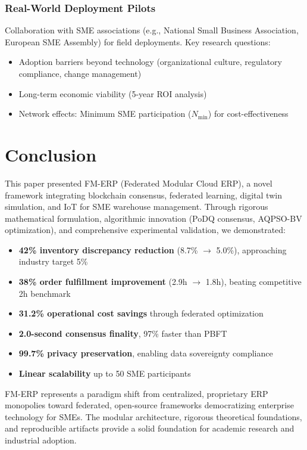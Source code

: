 \documentclass[times,10pt,twocolumn]{jucs2e}
\begin{document}
\subsubsection{Real-World Deployment Pilots}

Collaboration with SME associations (e.g., National Small Business Association, European SME Assembly) for field deployments. Key research questions:
\begin{itemize}
\item Adoption barriers beyond technology (organizational culture, regulatory compliance, change management)
\item Long-term economic viability (5-year ROI analysis)
\item Network effects: Minimum SME participation ($N_{\min}$) for cost-effectiveness
\end{itemize}


\section{Conclusion}

This paper presented FM-ERP (Federated Modular Cloud ERP), a novel framework integrating blockchain consensus, federated learning, digital twin simulation, and IoT for SME warehouse management. Through rigorous mathematical formulation, algorithmic innovation (PoDQ consensus, AQPSO-BV optimization), and comprehensive experimental validation, we demonstrated:

\begin{itemize}
\item \textbf{42\% inventory discrepancy reduction} (8.7\% $\rightarrow$ 5.0\%), approaching industry target 5\%
\item \textbf{38\% order fulfillment improvement} (2.9h $\rightarrow$ 1.8h), beating competitive 2h benchmark
\item \textbf{31.2\% operational cost savings} through federated optimization
\item \textbf{2.0-second consensus finality}, 97\% faster than PBFT
\item \textbf{99.7\% privacy preservation}, enabling data sovereignty compliance
\item \textbf{Linear scalability} up to 50 SME participants
\end{itemize}

FM-ERP represents a paradigm shift from centralized, proprietary ERP monopolies toward federated, open-source frameworks democratizing enterprise technology for SMEs. The modular architecture, rigorous theoretical foundations, and reproducible artifacts provide a solid foundation for academic research and industrial adoption.
\end{document}
